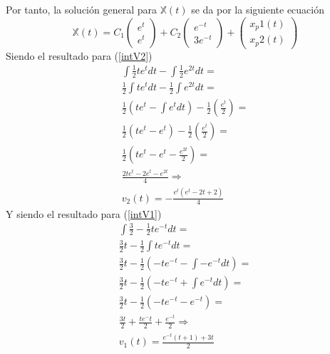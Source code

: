 \documentclass[12pt,spanish,lettersize,twocolumn]{article}
\begin{document}
Por tanto, la soluci\'on general para $\mathbb{X}(t)$ se da por la siguiente ecuaci\'on
\begin{equation}
\mathbb{X}(t)=C_1\left(\begin{array}{c}e^t\\e^t\end{array}\right)+C_2\left(\begin{array}{c}e^{-t}\\3e^{-t}\end{array}\right)+\left(\begin{array}{c}x_p1(t)\\x_p2(t)\end{array}\right)
\end{equation}
Siendo el resultado para (\ref{intV2})
\begin{eqnarray}
\nonumber\int\frac{1}{2}te^tdt-\int\frac{1}{2}e^{2t}dt = \\
\nonumber\frac{1}{2}\int te^tdt-\frac{1}{2}\int e^{2t}dt = \\
\nonumber\frac{1}{2}\left(te^t-\int e^tdt\right)-\frac{1}{2}\left(\frac{e^t}{2}\right)=\\
\nonumber\frac{1}{2}\left(te^t-e^t\right)-\frac{1}{2}\left(\frac{e^t}{2}\right)=\\
\nonumber \frac{1}{2}\left(te^t-e^t-\frac{e^{2t}}{2}\right)=\\
\frac{2te^t-2e^t-e^{2t}}{4}\Rightarrow\\
v_2(t)=-\frac{e^t(e^{t}-2t+2)}{4}
\end{eqnarray}
Y siendo el resultado para (\ref{intV1})
\begin{eqnarray}
\nonumber\int\frac{3}{2}-\frac{1}{2}te^{-t}dt=\\
\nonumber\frac{3}{2}t-\frac{1}{2}\int te^{-t}dt=\\
\nonumber\frac{3}{2}t-\frac{1}{2}\left(-te^{-t}-\int -e^{-t}dt\right)=\\
\nonumber\frac{3}{2}t-\frac{1}{2}\left(-te^{-t}+\int e^{-t}dt\right)=\\
\nonumber\frac{3}{2}t-\frac{1}{2}\left(-te^{-t}-e^{-t}\right)=\\
\nonumber \frac{3t}{2}+\frac{te^-t}{2}+\frac{e^{-t}}{2}\Rightarrow\\
v_1(t)=\frac{e^{-t}(t+1)+3t}{2}
\end{eqnarray}
\end{document}
